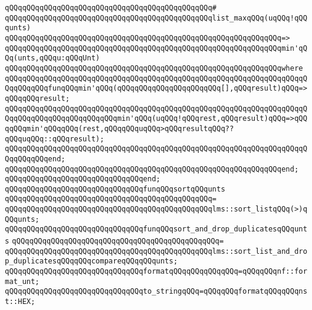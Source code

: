 \verb|qQQqqQQqqQQqqQQqqQQqqQQqqQQqqQQqqQQqqQQqqQQqqQQq#|\newline
\verb|qQQqqQQqqQQqqQQqqQQqqQQqqQQqqQQqqQQqqQQqqQQqqQQqlist_maxqQQq(uqQQq!qQQqunts)|\newline
\verb|qQQqqQQqqQQqqQQqqQQqqQQqqQQqqQQqqQQqqQQqqQQqqQQqqQQqqQQqqQQqqQQq=>|\newline
\verb|qQQqqQQqqQQqqQQqqQQqqQQqqQQqqQQqqQQqqQQqqQQqqQQqqQQqqQQqqQQqqQQqmin'qQQq(unts,qQQqu:qQQqUnt)|\newline
\verb|qQQqqQQqqQQqqQQqqQQqqQQqqQQqqQQqqQQqqQQqqQQqqQQqqQQqqQQqqQQqqQQqwhere|\newline
\verb|qQQqqQQqqQQqqQQqqQQqqQQqqQQqqQQqqQQqqQQqqQQqqQQqqQQqqQQqqQQqqQQqqQQqqQQqqQQqqQQqfunqQQqmin'qQQq(qQQqqQQqqQQqqQQqqQQqqQQq[],qQQqresult)qQQq=>qQQqqQQqresult;|\newline
\verb|qQQqqQQqqQQqqQQqqQQqqQQqqQQqqQQqqQQqqQQqqQQqqQQqqQQqqQQqqQQqqQQqqQQqqQQqqQQqqQQqqQQqqQQqqQQqqQQqmin'qQQq(uqQQq!qQQqrest,qQQqresult)qQQq=>qQQqqQQqmin'qQQqqQQq(rest,qQQqqQQquqQQq>qQQqresultqQQq??qQQquqQQq::qQQqresult);|\newline
\verb|qQQqqQQqqQQqqQQqqQQqqQQqqQQqqQQqqQQqqQQqqQQqqQQqqQQqqQQqqQQqqQQqqQQqqQQqqQQqqQQqend;|\newline
\verb|qQQqqQQqqQQqqQQqqQQqqQQqqQQqqQQqqQQqqQQqqQQqqQQqqQQqqQQqqQQqqQQqend;|\newline
\verb|qQQqqQQqqQQqqQQqqQQqqQQqqQQqqQQqend;|\newline
\newline
\verb|qQQqqQQqqQQqqQQqqQQqqQQqqQQqqQQqfunqQQqsortqQQqunts|\newline
\verb|qQQqqQQqqQQqqQQqqQQqqQQqqQQqqQQqqQQqqQQqqQQqqQQq=|\newline
\verb|qQQqqQQqqQQqqQQqqQQqqQQqqQQqqQQqqQQqqQQqqQQqqQQqlms::sort_listqQQq(>)qQQqunts;|\newline
\newline
\verb|qQQqqQQqqQQqqQQqqQQqqQQqqQQqqQQqfunqQQqsort_and_drop_duplicatesqQQqunts|\newline
\verb|qQQqqQQqqQQqqQQqqQQqqQQqqQQqqQQqqQQqqQQqqQQqqQQq=|\newline
\verb|qQQqqQQqqQQqqQQqqQQqqQQqqQQqqQQqqQQqqQQqqQQqqQQqlms::sort_list_and_drop_duplicatesqQQqqQQqcompareqQQqqQQqunts;|\newline
\newline
\verb|qQQqqQQqqQQqqQQqqQQqqQQqqQQqqQQqformatqQQqqQQqqQQqqQQq=qQQqqQQqnf::format_unt;|\newline
\verb|qQQqqQQqqQQqqQQqqQQqqQQqqQQqqQQqto_stringqQQq=qQQqqQQqformatqQQqqQQqnst::HEX;|\newline
